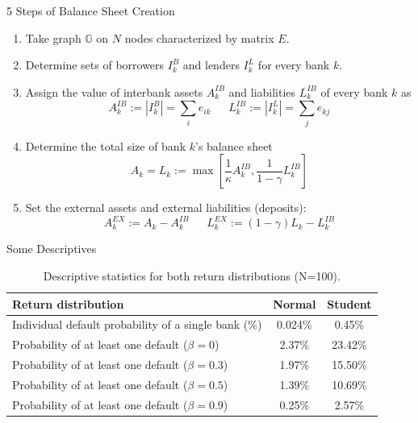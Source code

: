 \documentclass{beamer}
\begin{document}
\begin{appendix}
\begin{frame}{5 Steps of Balance Sheet Creation}
	\begin{enumerate}
		\item Take graph $\mathbb{G}$ on $N$ nodes characterized by matrix $E$.
		\item Determine sets of borrowers $I^B_k$ and lenders $I^L_k$ for every bank $k$.
		\item Assign the value of interbank assets $A^{IB}_k$ and liabilities $L^{IB}_k$ of every bank $k$ as
		\begin{equation}
		\nonumber
		A^{IB}_k:=|I^B_k| = \sum_{i} e_{ik} \ \ \ \ \ \ \ 		L^{IB}_k:=|I^L_k| = \sum_{j} e_{kj}
		\end{equation}
		\item Determine the total size of bank $k$'s balance sheet
		\begin{equation}
		\nonumber
		A_k=L_k:= \max\left[\frac{1}{\kappa}A^{IB}_k, \frac{1}{1-\gamma}L^{IB}_k\right]
		\end{equation}
		\item Set the external assets and external liabilities (deposits):
		\begin{equation}
		\nonumber
		A^{EX}_k:=A_k - A^{IB}_k \ \ \ \ \ \ \ 		L^{EX}_k:=(1-\gamma)L_k - L^{IB}_k
		\end{equation}
	\end{enumerate}
\end{frame}

\begin{frame}{Some Descriptives}
	\begin{table}
		\centering
		\begin{tabular}{l || c c}
			Return distribution	& Normal & Student \\
			\hline
			Individual default probability of a single bank (\%) & 0.024\% & 0.45\% \\
			Probability of at least one default ($\beta=0$) & 2.37\% & 23.42\% \\
			Probability of at least one default ($\beta=0.3$) & 1.97\% & 15.50\% \\
			Probability of at least one default ($\beta=0.5$) & 1.39\% & 10.69\% \\
			Probability of at least one default ($\beta=0.9$) & 0.25\% & 2.57\% \end{tabular}
		\caption{Descriptive statistics for both return distributions (N=100).}
		\label{tab:Results:DescriptiveStatistics}
	\end{table}
\end{frame}


\end{appendix}
\end{document}
